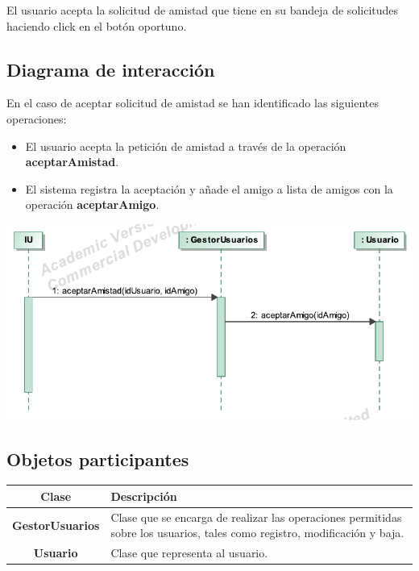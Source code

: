 \documentclass[12pt, a4paper, titlepage]{article}
\begin{document}
El usuario acepta la solicitud de amistad que tiene en su bandeja de solicitudes haciendo click en el botón oportuno.

\subsection{Diagrama de interacción}

En el caso de {\sc aceptar solicitud de amistad } se han identificado las siguientes operaciones:

\begin{itemize}
	\item El usuario acepta la petición de amistad a través de la operación \textbf{aceptarAmistad}.
	\item El sistema registra la aceptación y añade el amigo a lista de amigos con la operación \textbf{aceptarAmigo}.
\end{itemize}

\begin{center}
	\includegraphics{Imagenes/OperacionAceptarAmistad}
\end{center}



\subsection{Objetos participantes}

\begin{center}

\begin{tabular}{|c|p{14cm}|}
	\hline
	\textbf{Clase} & \textbf{Descripción}\\ \hline
	\textbf{GestorUsuarios} &  Clase que se encarga de realizar las operaciones permitidas sobre los usuarios, tales como registro, modificación y baja.\\ \hline
	\textbf{Usuario} & Clase que representa al usuario. \\ \hline
\end{tabular}

\end{center}
\end{document}
